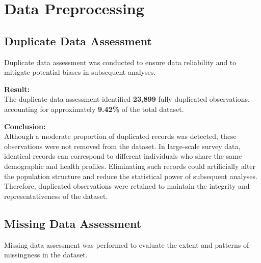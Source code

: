 \section{Data Preprocessing}
\subsection{Duplicate Data Assessment}

Duplicate data assessment was conducted to ensure data reliability and to mitigate potential biases in subsequent analyses.

\textbf{Result:} \\
The duplicate data assessment identified \textbf{23{,}899} fully duplicated observations, accounting for approximately \textbf{9.42\%} of the total dataset.

\textbf{Conclusion:} \\
Although a moderate proportion of duplicated records was detected, these observations were not removed from the dataset. In large-scale survey data, identical records can correspond to different individuals who share the same demographic and health profiles. Eliminating such records could artificially alter the population structure and reduce the statistical power of subsequent analyses. Therefore, duplicated observations were retained to maintain the integrity and representativeness of the dataset.

\subsection{Missing Data Assessment}

Missing data assessment was performed to evaluate the extent and patterns of missingness in the dataset.
 
